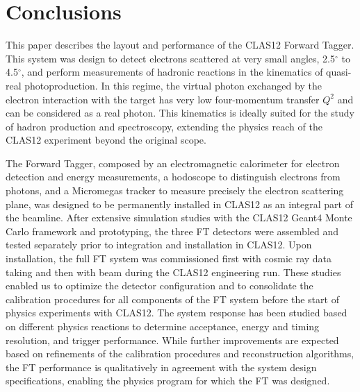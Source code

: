 \section{Conclusions}

This paper describes the layout and performance of the CLAS12 Forward Tagger. This system was design to detect
electrons scattered at very small angles, 2.5$^\circ$ to 4.5$^\circ$, and perform measurements of hadronic reactions
in the kinematics of quasi-real photoproduction. In this regime, the virtual photon exchanged by the electron
interaction with the target has very low four-momentum transfer $Q^2$ and can be considered as a real photon. This
kinematics is ideally suited for the study of hadron production and spectroscopy,  extending the physics reach of the
CLAS12 experiment beyond the original scope.

The Forward Tagger, composed by an electromagnetic calorimeter for electron detection and energy measurements,
a hodoscope to distinguish electrons from photons, and a Micromegas tracker to measure precisely the electron
scattering plane, was designed to be permanently installed in CLAS12 as an integral part of the beamline. After
extensive simulation studies with the CLAS12 Geant4 Monte Carlo framework and prototyping, the three FT
detectors were assembled and tested separately prior to integration and installation in CLAS12. Upon installation, the
full FT system was commissioned first with cosmic ray data taking and then with beam during the CLAS12 engineering
run. These studies enabled us to optimize the detector configuration and to consolidate the calibration procedures for
all components of the FT system before the start of physics experiments with CLAS12. The system response has been
studied based on different physics reactions to determine acceptance, energy and timing resolution, and trigger
performance. While further improvements are expected based on refinements of the calibration procedures and
reconstruction algorithms, the FT performance is qualitatively in agreement with the system design specifications,
enabling the physics program for which the FT was designed.
